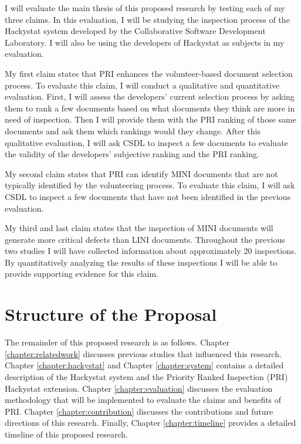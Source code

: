 I will evaluate the main thesis of this proposed research by testing each
of my three claims. In this evaluation, I will be studying the inspection
process of the Hackystat system developed by the Collaborative Software
Development Laboratory. I will also be using the developers of Hackystat as
subjects in my evaluation.

My first claim states that PRI enhances the volunteer-based document
selection process. To evaluate this claim, I will conduct a qualitative and
quantitative evaluation.  First, I will assess the developers' current
selection process by asking them to rank a few documents based on what
documents they think are more in need of inspection. Then I will provide
them with the PRI ranking of those same documents and ask them which
rankings would they change. After this qualitative evaluation, I will ask
CSDL to inspect a few documents to evaluate the validity of the developers'
subjective ranking and the PRI ranking.

My second claim states that PRI can identify MINI documents that are not
typically identified by the volunteering process. To evaluate this claim, I
will ask CSDL to inspect a few documents that have not been identified in
the previous evaluation.

My third and last claim states that the inspection of MINI documents will
generate more critical defects than LINI documents. Throughout the
previous two studies I will have collected information about approximately
20 inspections. By quantitatively analyzing the results of these
inspections I will be able to provide supporting evidence for this claim.


\section{Structure of the Proposal}
The remainder of this proposed research is as follows. Chapter
\ref{chapter:relatedwork} discusses previous studies that influenced this
research. Chapter \ref{chapter:hackystat} and Chapter \ref{chapter:system}
contains a detailed description of the Hackystat system and the Priority
Ranked Inspection (PRI) Hackystat extension. Chapter
\ref{chapter:evaluation} discusses the evaluation methodology that will be
implemented to evaluate the claims and benefits of PRI. Chapter
\ref{chapter:contribution} discusses the contributions and future
directions of this research. Finally, Chapter \ref{chapter:timeline}
provides a detailed timeline of this proposed research.














